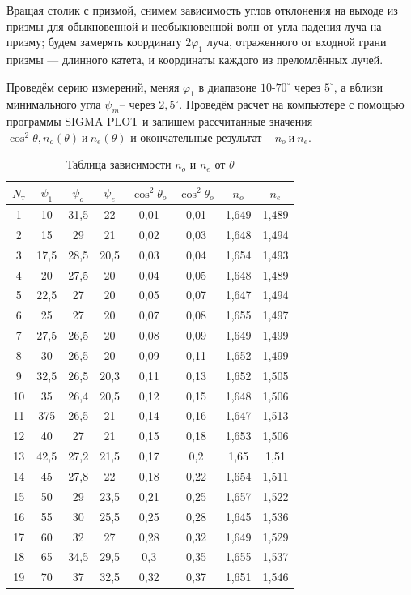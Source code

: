 \documentclass[journal, a4paper]{IEEEtran}
\begin{document}
 Вращая столик с призмой, снимем зависимость углов отклонения на
выходе из призмы для обыкновенной
и необыкновенной волн от угла
падения луча на призму;
будем замерять координату $2\varphi_1$ луча, отраженного от входной грани призмы — длинного катета, и координаты
каждого из преломлённых лучей.

Проведём серию измерений, меняя $\varphi_1$ в диапазоне $10$-$70^{\circ}$ через $5^{\circ}$, а вблизи минимального угла $\psi_m$-- через $2,5^{\circ}$.  Проведём расчет на компьютере с помощью программы SIGMA PLOT и запишем рассчитанные значения $\cos^2{\theta}, n_o(\theta)~ \text{и}~ n_e(\theta)$ и окончательные результат -- $n_o ~\text{и}~ n_e$.

\begin{table}[h!]
\begin{center}
\begin{tabular}{|c|c|c|c|c|c|c|c|}
\hline 
$N_{\text{т}}$ & $\psi_1$ & $\psi_o$ & $\psi_e$ & $\cos^2{\theta_o}$ & $\cos^2{\theta_o}$ & $n_o$ & $n_e$ \\ 
\hline 
1 & 10 & 31,5 & 22 & 0,01 & 0,01 & 1,649 & 1,489 \\ 
\hline 
2 & 15 & 29 & 21 & 0,02 & 0,03 & 1,648 & 1,494 \\ 
\hline 
3 & 17,5 & 28,5 & 20,5 & 0,03 & 0,04 & 1,654 & 1,493 \\ 
\hline 
4 & 20 & 27,5 & 20 & 0,04 & 0,05 & 1,648 & 1,489 \\ 
\hline 
5 & 22,5 & 27 & 20 & 0,05 & 0,07 & 1,647 & 1,494 \\ 
\hline 
6 & 25 & 27 & 20 & 0,07 & 0,08 & 1,655 & 1,497 \\ 
\hline 
7 & 27,5 & 26,5 & 20 & 0,08 & 0,09 & 1,649 & 1,499 \\ 
\hline 
8 & 30 & 26,5 & 20 & 0,09 & 0,11 & 1,652 & 1,499 \\ 
\hline 
9 & 32,5 & 26,5 & 20,3 & 0,11 & 0,13 & 1,652 & 1,505 \\ 
\hline 
10 & 35 & 26,4 & 20,5 & 0,12 & 0,15 & 1,648 & 1,506 \\ 
\hline 
11 & 375 & 26,5 & 21 & 0,14 & 0,16 & 1,647 & 1,513 \\ 
\hline 
12 & 40 & 27 & 21 & 0,15 & 0,18 & 1,653 & 1,506 \\ 
\hline 
13 & 42,5 & 27,2 & 21,5 & 0,17 & 0,2 & 1,65 & 1,51 \\ 
\hline 
14 & 45 & 27,8 & 22 & 0,18 & 0,22 & 1,654 & 1,511 \\ 
\hline 
15 & 50 & 29 & 23,5 & 0,21 & 0,25 & 1,657 & 1,522 \\ 
\hline 
16 & 55 & 30 & 25,5 & 0,25 & 0,28 & 1,645 & 1,536 \\ 
\hline 
17 & 60 & 32 & 27 & 0,28 & 0,32 & 1,649 & 1,529 \\ 
\hline 
18 & 65 & 34,5 & 29,5 & 0,3 & 0,35 & 1,655 & 1,537 \\ 
\hline 
19 & 70& 37 & 32,5 & 0,32 & 0,37 & 1,651 & 1,546 \\ 
\hline 
\end{tabular}
\end{center} 
\caption{Таблица зависимости $n_o$ и $n_e$ от $\theta$}
\end{table}
\end{document}
